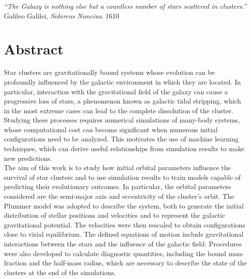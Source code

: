 \begin{flushright}
	\textit{“The Galaxy is nothing else but a countless number
		of stars scattered in clusters.”}
	\vspace{0.2cm}
	Galileo Galilei, \textit{Sidereus Nuncius}, 1610
\end{flushright}

\vspace{0.5cm}
{}

\chapter*{Abstract} %
\label{sommario}
Star clusters are gravitationally bound systems whose evolution can be profoundly influenced by the galactic environment in which they are located. In particular, interaction with the gravitational field of the galaxy can cause a progressive loss of stars, a phenomenon known as galactic tidal stripping, which in the most extreme cases can lead to the complete dissolution of the cluster.\\
Studying these processes requires numerical simulations of many-body systems, whose computational cost can become significant when numerous initial configurations need to be analyzed.
This motivates the use of machine learning techniques, which can derive useful relationships from simulation results to make new predictions.\\

\noindent The aim of this work is to study how initial orbital parameters influence the survival of star clusters and to use simulation results to train models capable of predicting their evolutionary outcomes. In particular, the orbital parameters considered are the semi-major axis and eccentricity of the cluster's orbit. The Plummer model was adopted to describe the system, both to generate the initial distribution of stellar positions and velocities and to represent the galactic gravitational potential. The velocities were then rescaled to obtain configurations close to virial equilibrium. The defined equations of motion include gravitational interactions between the stars and the influence of the galactic field. Procedures were also developed to calculate diagnostic quantities, including the bound mass fraction and the half-mass radius, which are necessary to describe the state of the clusters at the end of the simulations.\\

